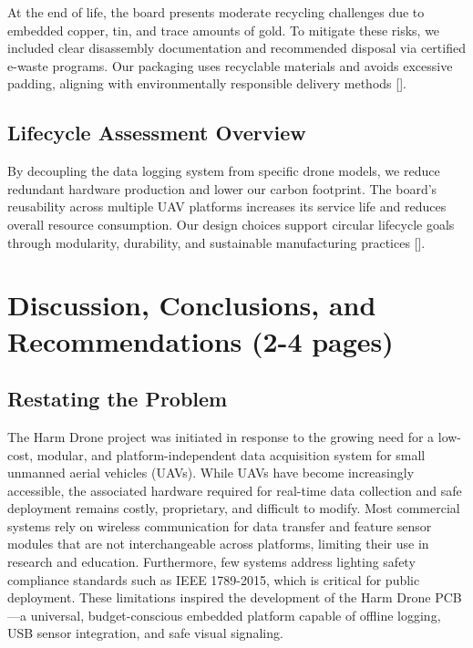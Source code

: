 \documentclass[12pt]{article}
\begin{document}
\par At the end of life, the board presents moderate recycling challenges due to embedded copper, tin, and trace amounts of gold. To mitigate these risks, we included clear disassembly documentation and recommended disposal via certified e-waste programs. Our packaging uses recyclable materials and avoids excessive padding, aligning with environmentally responsible delivery methods [].

\subsection{Lifecycle Assessment Overview}

\par By decoupling the data logging system from specific drone models, we reduce redundant hardware production and lower our carbon footprint. The board’s reusability across multiple UAV platforms increases its service life and reduces overall resource consumption. Our design choices support circular lifecycle goals through modularity, durability, and sustainable manufacturing practices [].
\section{Discussion, Conclusions, and Recommendations (2-4 pages)}
\subsection{Restating the Problem}

\par The Harm Drone project was initiated in response to the growing need for a low-cost, modular, and platform-independent data acquisition system for small unmanned aerial vehicles (UAVs). While UAVs have become increasingly accessible, the associated hardware required for real-time data collection and safe deployment remains costly, proprietary, and difficult to modify. Most commercial systems rely on wireless communication for data transfer and feature sensor modules that are not interchangeable across platforms, limiting their use in research and education. Furthermore, few systems address lighting safety compliance standards such as IEEE 1789-2015, which is critical for public deployment. These limitations inspired the development of the Harm Drone PCB—a universal, budget-conscious embedded platform capable of offline logging, USB sensor integration, and safe visual signaling.
\end{document}
